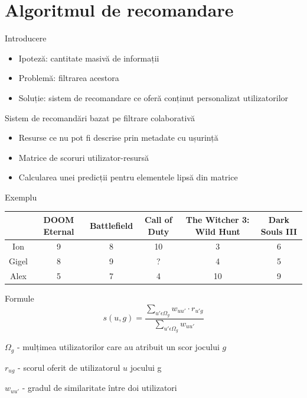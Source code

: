 \documentclass{beamer}
\begin{document}
\section{Algoritmul de recomandare}
\frame{\tableofcontents[currentsection]}
\begin{frame}{Introducere}
 
    \begin{itemize}
        \item Ipoteză: cantitate masivă de informații
        \item Problemă: filtrarea acestora
        \item Soluție: sistem de recomandare ce oferă conținut personalizat utilizatorilor
    \end{itemize}
\end{frame}

\begin{frame}{Sistem de recomandări bazat pe filtrare colaborativă}
    \begin{itemize}
        \item Resurse ce nu pot fi descrise prin metadate cu ușurință
        \item Matrice de scoruri utilizator-resursă
        \item Calcularea unei predicții pentru elementele lipsă din matrice
    \end{itemize}
\end{frame}

\begin{frame}{Exemplu}
\begin{center}
\begin{adjustbox}{max size={\textwidth}{\textheight}}
\begin{tabular}{||c c c c c c||} 
 \hline
 & DOOM Eternal & Battlefield & Call of Duty & The Witcher 3: Wild Hunt & Dark Souls III \\ [0.5ex] 
 \hline\hline
 Ion & 9 & 8 & 10 & 3 & 6 \\ 
 \hline
 Gigel & 8 & 9 & ? & 4 & 5  \\
 \hline
 Alex & 5 & 7 & 4 & 10 & 9 \\
 \hline
\end{tabular}
\end{adjustbox}
\end{center}
    
\end{frame}

\begin{frame}{Formule}
    \[ s(u, g) = \dfrac{ \sum\limits_{u' \epsilon \Omega_{g} } w_{uu'} \cdot r_{u'g} }{\sum\limits_{u' \epsilon \Omega_{g}} w_{uu'}}  \]
    
    \( \Omega_{g}\) - mulțimea utilizatorilor care au atribuit un scor jocului \( g \)
    
    \( r_{ug} \) - scorul oferit de utilizatorul \( u \) jocului g
    
    \( w_{uu'}\) - gradul de similaritate între doi utilizatori
\end{frame}
\end{document}
